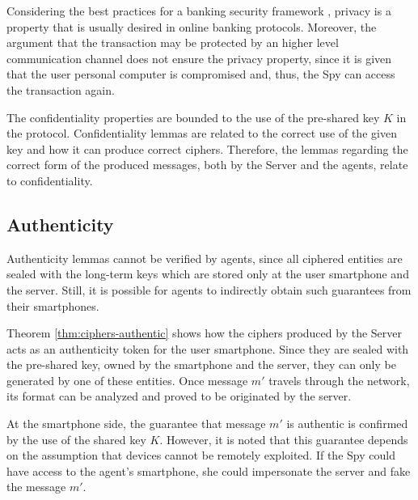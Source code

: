 Considering the best practices for a banking security framework \cite{Hutchinson2003}, privacy is a property that is usually desired in online banking protocols. Moreover, the argument that the transaction may be protected by an higher level communication channel does not ensure the privacy property, since it is given that the user personal computer is compromised and, thus, the Spy can access the transaction again.

The confidentiality properties are bounded to the use of the pre-shared key \(K\) in the protocol. Confidentiality lemmas are related to the correct use of the given key and how it can produce correct ciphers. Therefore, the lemmas regarding the correct form of the produced messages, both by the Server and the agents, relate to confidentiality.



\subsection{Authenticity}
Authenticity lemmas cannot be verified by agents, since all ciphered entities are sealed with the long-term keys which are stored only at the user smartphone and the server. Still, it is possible for agents to indirectly obtain such guarantees from their smartphones.

Theorem \ref{thm:ciphers-authentic} shows how the ciphers produced by the Server acts as an authenticity token for the user smartphone. Since they are sealed with the pre-shared key, owned by the smartphone and the server, they can only be generated by one of these entities. Once message \(m'\) travels through the network, its format can be analyzed and proved to be originated by the server. 

At the smartphone side, the guarantee that message \(m'\) is authentic is confirmed by the use of the shared key \(K\). However, it is noted that this guarantee depends on the assumption that devices cannot be remotely exploited. If the Spy could have access to the agent's smartphone, she could impersonate the server and fake the message \(m'\). 

